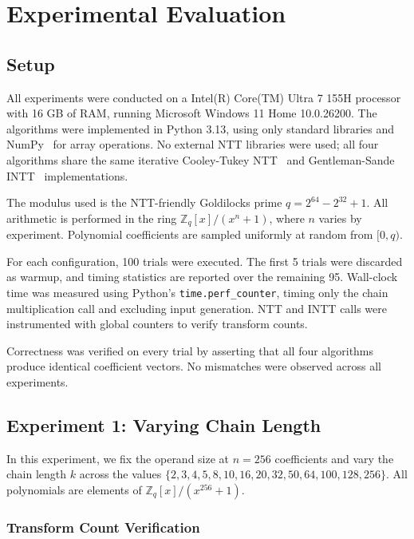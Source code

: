 \documentclass[runningheads]{llncs}
\begin{document}
\section{Experimental Evaluation}

\subsection{Setup}

All experiments were conducted on a Intel(R) Core(TM) Ultra 7 155H processor with 16 GB of RAM, running Microsoft Windows 11 Home 10.0.26200. The algorithms were implemented in Python 3.13, using only standard libraries and NumPy~\cite{numpy} for array operations. No external NTT libraries were used; all four algorithms share the same iterative Cooley-Tukey NTT~\cite{cooley1965algorithm} and Gentleman-Sande INTT~\cite{gentleman1966fft} implementations.

The modulus used is the NTT-friendly Goldilocks prime $q = 2^{64} - 2^{32} + 1$. All arithmetic is performed in the ring $\mathbb{Z}_q[x]/(x^n + 1)$, where $n$ varies by experiment. Polynomial coefficients are sampled uniformly at random from $[0, q)$.

For each configuration, 100 trials were executed. The first 5 trials were discarded as warmup, and timing statistics are reported over the remaining 95. Wall-clock time was measured using Python's \texttt{time.perf\_counter}, timing only the chain multiplication call and excluding input generation. NTT and INTT calls were instrumented with global counters to verify transform counts.

Correctness was verified on every trial by asserting that all four algorithms produce identical coefficient vectors. No mismatches were observed across all experiments.

\subsection{Experiment 1: Varying Chain Length}

In this experiment, we fix the operand size at $n = 256$ coefficients and vary the chain length $k$ across the values $\{2, 3, 4, 5, 8, 10, 16, 20, 32, 50, 64, 100, 128, 256\}$. All polynomials are elements of $\mathbb{Z}_q[x]/(x^{256}+1)$.

\subsubsection{Transform Count Verification}
\end{document}
